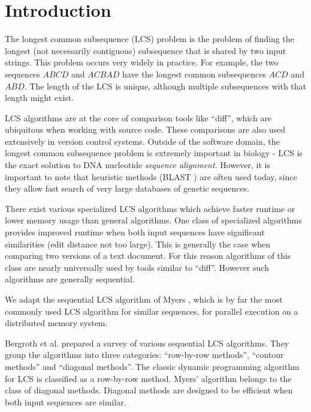 \section{Introduction}\label{sec:intro}

 The longest common subsequence (LCS) problem is the problem of finding the longest (not necessarily contiguous) subsequence that is shared by two input strings. This problem occurs very widely in practice. For example, the two sequences $ABCD$ and $ACBAD$ have the longest common subsequences $ACD$ and $ABD$. The length of the LCS is unique, although multiple subsequences with that length might exist.

LCS algorithms are at the core of comparison tools like ``diff'', which are ubiquitous when working with source code. These comparisons are also used extensively in version control systems. Outside of the software domain, the longest common subsequence problem is extremely important in biology - LCS is the exact solution to DNA nucleotide \emph{sequence alignment}. However, it is important to note that heuristic methods (BLAST \cite{altschul_basic_1990}) are often used today, since they allow fast search of very large databases of genetic sequences.

There exist various specialized LCS algorithms which achieve faster runtime or lower memory usage than general algorithms. One class of specialized algorithms provides improved runtime when both input sequences have significant similarities (edit distance not too large). This is generally the case when comparing two versions of a text document. For this reason algorithms of this class are nearly universally used by tools similar to ``diff''. However such algorithms are generally sequential.

We adapt the sequential LCS algorithm of Myers \cite{myers_anond_1986}, which is by far the most commonly used LCS algorithm for similar sequences, for parallel execution on a distributed memory system.

 Bergroth et al. prepared a survey \cite{bergroth_survey_2000} of various sequential LCS algorithms. They group the algorithms into three categories: ``row-by-row methods'', ``contour methods'' and ``diagonal methods''. The classic dynamic programming algorithm for LCS \cite{wagner_string--string_1974} is classified as a row-by-row method. Myers' algorithm \cite{myers_anond_1986} belongs to the class of diagonal methods. Diagonal methods are designed to be efficient when both input sequences are similar. 

